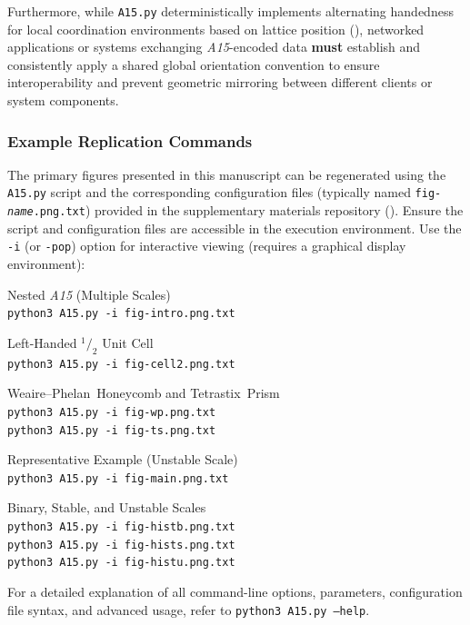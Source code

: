 \documentclass[10pt]{article}
\def\AAAB{\textit{A15}}
\def\WP{Weaire--Phelan}
\def\WPH{\WP{}~Honeycomb}
\def\TSP{Tetrastix~Prism}
\begin{document}
Furthermore, while \texttt{A15.py} deterministically implements alternating handedness for local coordination environments based on lattice position (), networked applications or systems exchanging \AAAB{}-encoded data \textbf{must} establish and consistently apply a shared global orientation convention to ensure interoperability and prevent geometric mirroring between different clients or system components.

\subsubsection{Example Replication Commands}\label{subsubsec:repl-commands}
The primary figures presented in this manuscript can be regenerated using the \texttt{A15.py} script and the corresponding configuration files (typically named \texttt{fig-\textit{name}.png.txt}) provided in the supplementary materials repository (). Ensure the script and configuration files are accessible in the execution environment. Use the \texttt{-i} (or \texttt{-pop}) option for interactive viewing (requires a graphical display environment):

\begin{description} \itemsep0pt
    \item[\Cref{fig:intro} (Intro):] Nested \AAAB{} (Multiple Scales) \\
        \texttt{python3 A15.py -i fig-intro.png.txt}
    \item[\Cref{fig:cell2} (Internals):] Left-Handed $^1/_2$ Unit Cell \\
        \texttt{python3 A15.py -i fig-cell2.png.txt}
    \item[\Cref{fig:wp-ts} (Partitions):] \WPH{} and \TSP{} \\
        \texttt{python3 A15.py -i fig-wp.png.txt} \\
        \texttt{python3 A15.py -i fig-ts.png.txt}
    \item[\Cref{fig:main} (Composite):] Representative Example (Unstable Scale) \\
        \texttt{python3 A15.py -i fig-main.png.txt}
    \item[\Cref{fig:hist} (Histograms):] Binary, Stable, and Unstable Scales \\
        \texttt{python3 A15.py -i fig-histb.png.txt} \\
        \texttt{python3 A15.py -i fig-hists.png.txt} \\
        \texttt{python3 A15.py -i fig-histu.png.txt}
\end{description}
For a detailed explanation of all command-line options, parameters, configuration file syntax, and advanced usage, refer to \texttt{python3 A15.py --help}.
\end{document}
